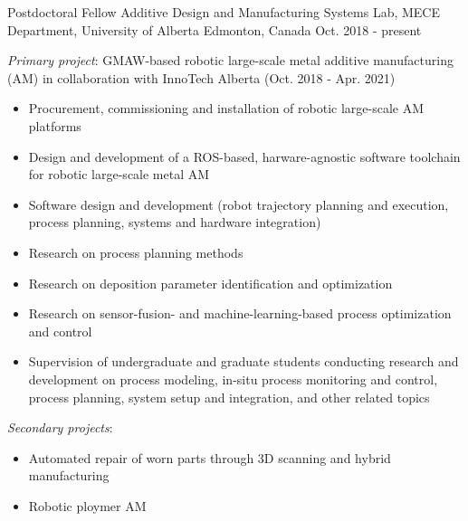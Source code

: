 

\begin{cventries}

  \cventry
    {Postdoctoral Fellow} %
    {Additive Design and Manufacturing Systems Lab, MECE Department, University of Alberta} %
    {Edmonton, Canada} %
    {Oct. 2018 - present} %
    {
      \begin{cvitems}
        \item \emph{Primary project}: GMAW-based robotic large-scale metal additive manufacturing (AM) \newline
        in collaboration with InnoTech Alberta (Oct. 2018 - Apr. 2021)
        \begin{itemize}
          \item Procurement, commissioning and installation of robotic large-scale AM platforms
          \item Design and development of a ROS-based, harware-agnostic software toolchain for robotic large-scale metal AM
          \item Software design and development (robot trajectory planning and execution, process planning, systems and hardware integration)
          \item Research on process planning methods
          \item Research on deposition parameter identification and optimization
          \item Research on sensor-fusion- and machine-learning-based process optimization and control
          \item Supervision of undergraduate and graduate students conducting research and development on process modeling, 
                in-situ process monitoring and control, process planning, system setup and integration, and other related topics
        \end{itemize}
        \item \emph{Secondary projects}:
        \begin{itemize}
          \item Automated repair of worn parts through 3D scanning and hybrid manufacturing
          \item Robotic ploymer AM
        \end{itemize}
      \end{cvitems}
    }


\end{cventries}
